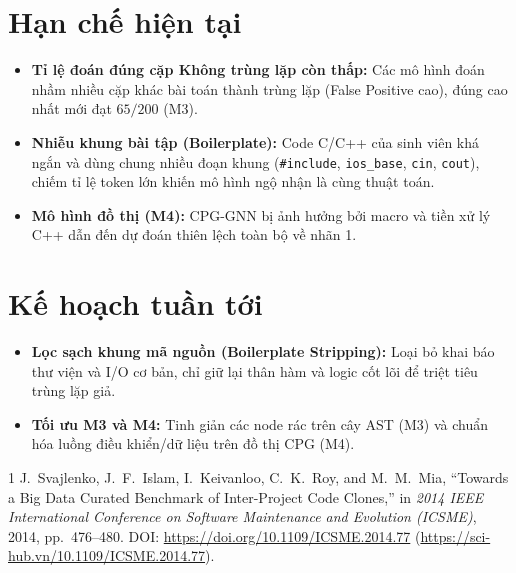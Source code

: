 \documentclass[11pt,a4paper]{article}
\begin{document}
\section{Hạn chế hiện tại}
\begin{itemize}
\item \textbf{Tỉ lệ đoán đúng cặp Không trùng lặp còn thấp:} Các mô hình đoán nhầm nhiều cặp khác bài toán thành trùng lặp (False Positive cao), đúng cao nhất mới đạt $65 / 200$ (M3).
\item \textbf{Nhiễu khung bài tập (Boilerplate):} Code C/C++ của sinh viên khá ngắn và dùng chung nhiều đoạn khung (\texttt{\#include}, \texttt{ios\_base}, \texttt{cin}, \texttt{cout}), chiếm tỉ lệ token lớn khiến mô hình ngộ nhận là cùng thuật toán.
\item \textbf{Mô hình đồ thị (M4):} CPG-GNN bị ảnh hưởng bởi macro và tiền xử lý C++ dẫn đến dự đoán thiên lệch toàn bộ về nhãn 1.
\end{itemize}

\section{Kế hoạch tuần tới}
\begin{itemize}
\item \textbf{Lọc sạch khung mã nguồn (Boilerplate Stripping):} Loại bỏ khai báo thư viện và I/O cơ bản, chỉ giữ lại thân hàm và logic cốt lõi để triệt tiêu trùng lặp giả.
\item \textbf{Tối ưu M3 và M4:} Tinh giản các node rác trên cây AST (M3) và chuẩn hóa luồng điều khiển/dữ liệu trên đồ thị CPG (M4).
\end{itemize}

\begin{thebibliography}{1}
J.~Svajlenko, J.~F.~Islam, I.~Keivanloo, C.~K.~Roy, and M.~M.~Mia, ``Towards a Big Data Curated Benchmark of Inter-Project Code Clones,'' in \textit{2014 IEEE International Conference on Software Maintenance and Evolution (ICSME)}, 2014, pp.~476--480. DOI: \url{https://doi.org/10.1109/ICSME.2014.77} (\url{https://sci-hub.vn/10.1109/ICSME.2014.77}).
\end{thebibliography}
\end{document}
